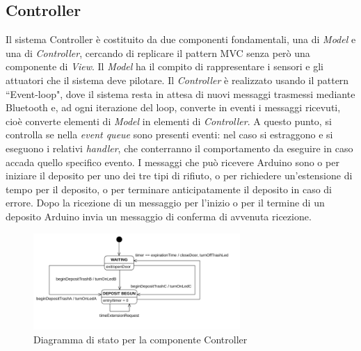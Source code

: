 \documentclass[a4paper, 12pt]{report}
\begin{document}
			\subsection{Controller}
			Il sistema Controller è costituito da due componenti fondamentali, una di \textit{Model}
			e una di \textit{Controller}, cercando di replicare il pattern MVC senza però una componente
			di \textit{View}. Il \textit{Model} ha il compito di rappresentare i sensori e gli attuatori
			che il sistema deve pilotare. Il \textit{Controller} è realizzato usando il pattern ``Event-loop", dove il
			sistema resta in attesa di nuovi messaggi trasmessi mediante Bluetooth e, ad ogni iterazione del 
			loop, converte in eventi i messaggi ricevuti, cioè converte elementi di \textit{Model} in
			elementi di \textit{Controller}. A questo punto, si controlla se nella \textit{event queue} sono
			presenti eventi: nel caso si estraggono e si eseguono i relativi \textit{handler}, che
			conterranno il comportamento da eseguire in caso accada quello specifico evento. I
			messaggi che può ricevere Arduino sono o per iniziare il deposito per uno dei tre
			tipi di rifiuto, o per richiedere un'estensione di tempo per il deposito, o per terminare
			anticipatamente il deposito in caso di errore. Dopo la ricezione di un messaggio per l'inizio
			o per il termine di un deposito Arduino invia un messaggio di conferma di avvenuta ricezione.
			\begin{figure}[H]
				\centering
				\includegraphics[width=0.7\textwidth]{"img/ControllerStatechart"}    
				\caption{Diagramma di stato per la componente Controller}
			\end{figure}
\end{document}
